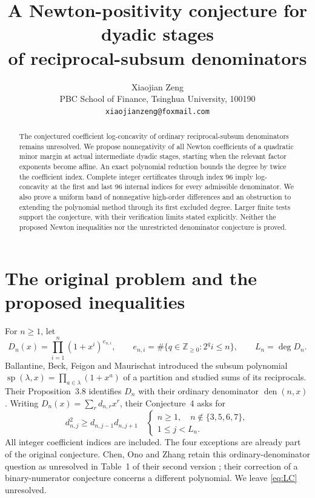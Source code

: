 \documentclass[11pt]{article}
\title{A Newton-positivity conjecture for dyadic stages\\
of reciprocal-subsum denominators}
\author{Xiaojian Zeng\\
\small PBC School of Finance, Tsinghua University, 100190\\
\small \texttt{xiaojianzeng@foxmail.com}}
\date{}
\newcommand{\Z}{\mathbb Z}
\begin{document}
\maketitle
\begin{abstract}
The conjectured coefficient log-concavity of ordinary reciprocal-subsum
denominators remains unresolved. We propose nonnegativity of all Newton
coefficients of a quadratic minor margin at actual intermediate dyadic
stages, starting when the relevant factor exponents become affine.
An exact polynomial reduction bounds the degree by twice the coefficient
index. Complete integer certificates through index 96 imply log-concavity
at the first and last 96 internal indices for every admissible denominator.
We also prove a uniform band of nonnegative high-order differences and an
obstruction to extending the polynomial method through its first excluded
degree. Larger finite tests support the conjecture, with their verification
limits stated explicitly. Neither the proposed Newton inequalities nor
the unrestricted denominator conjecture is proved.
\end{abstract}

\section{The original problem and the proposed inequalities}

For $n\geq1$, let
\begin{equation}\label{eq:D}
 D_n(x)=\prod_{i=1}^{n}(1+x^i)^{e_{n,i}},\qquad
 e_{n,i}=\#\{q\in\Z_{\geq0}:2^qi\leq n\},\qquad L_n=\deg D_n.
\end{equation}
Ballantine, Beck, Feigon and Maurischat introduced the subsum polynomial
$\operatorname{sp}(\lambda,x)=\prod_{a\in\lambda}(1+x^a)$ of a partition
and studied sums of its reciprocals. Their Proposition~3.8 identifies
$D_n$ with their ordinary denominator $\operatorname{den}(n,x)$
\cite{BBFM}. Writing $D_n(x)=\sum_r d_{n,r}x^r$, their Conjecture~4 asks for
\begin{equation}\tag{LC}\label{eq:LC}
 d_{n,j}^2\geq d_{n,j-1}d_{n,j+1}\quad
 \left\{\begin{array}{l}
 n\geq1,\quad n\notin\{3,5,6,7\},\\
 1\leq j<L_n.
 \end{array}\right.
\end{equation}
All integer coefficient indices are included. The four exceptions are
already part of the original conjecture. Chen, Ono and Zhang retain this
ordinary-denominator question as unresolved in Table~1 of their second
version \cite{COZ}; their correction of a binary-numerator conjecture
concerns a different polynomial. We leave \eqref{eq:LC} unresolved.
\end{document}
